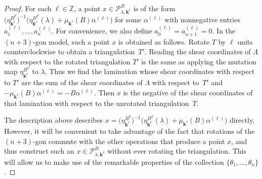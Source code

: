 \documentclass[10pt]{article}
\theoremstyle{definition}
\theoremstyle{remark}
\numberwithin{equation}{section}
\newcommand{\integers}{\mathbb Z}
\newcommand{\set}[1]{{\lbrace #1 \rbrace}}
\newcommand{\0}{{\mathbf{0}}}
\newcommand{\kk}{{\boldsymbol{k}}}
\renewcommand{\P}{\mathcal{P}}
\begin{document}
\begin{proof}
For each $\ell\in\integers$, a point $x\in \P^B_{\lambda,\kk^\ell}$ is of the form $\bigl(\eta_{\kk^\ell}^{B^T}\bigr)^{-1}\bigl(\eta_{\kk^\ell}^{B^T}(\lambda)+\mu_{\kk^\ell}(B)\alpha^{(\ell)}\bigr)$ for some $\alpha^{(\ell)}$ with nonnegative entries $a_1^{(\ell)},\ldots,a_n^{(\ell)}$.
For convenience, we also define $a_0^{(\ell)}=a_{n+1}^{(\ell)}=0$.
In the $(n+3)$-gon model, such a point $x$ is obtained as follows.
Rotate $T$ by $\ell$ units counterclockwise to obtain a triangulation~$T'$.
Reading the shear coordinates of $\Lambda$ with respect to the rotated triangulation $T'$ is the same as applying the mutation map $\eta^{B^T}_{\kk^\ell}$ to $\lambda$.
Thus we find the lamination whose shear coordinates with respect to $T'$ are the sum of the shear coordinates of $\Lambda$ with respect to~$T'$ and $-\mu_{\kk^\ell}(B)\alpha^{(\ell)}=-B\alpha^{(\ell)}$.
Then $x$ is the negative of the shear coordinates of that lamination with respect to the unrotated triangulation~$T$.

The description above describes ${x=\bigl(\eta_{\kk^\ell}^{B^T}\bigr)^{-1}\bigl(\eta_{\kk^\ell}^{B^T}(\lambda)+\mu_{\kk^\ell}(B)\alpha^{(\ell)}}\bigr)$ directly.
However, it will be convenient to take advantage of the fact that rotations of the $(n+3)$-gon commute with the other operations that produce a point $x$, and thus construct such an $x\in \P^B_{\lambda,\kk^\ell}$ without ever rotating the triangulation.
This will allow us to make use of the remarkable properties of the collection $\set{\theta_1,\ldots,\theta_n}$.


\end{proof}
\end{document}
